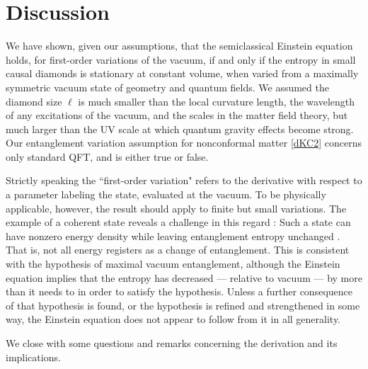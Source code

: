 \documentclass[aps,prd,twocolumn,showpacs,groupedaddress,nofootinbib,longbibliography]{revtex4-1}
\def\la{\langle}
\def\ra{\rangle}
\begin{document}
\section{Discussion}

We have shown, given our assumptions, that the semiclassical Einstein equation 
holds, 
for first-order  variations of the vacuum, 
if and only if the entropy in small causal diamonds is stationary at constant volume, when varied from a maximally symmetric vacuum state of geometry and quantum fields. 
We assumed the diamond size $\ell$ is much smaller than the local curvature length, 
the wavelength of any excitations of the vacuum, and
the scales in the matter field theory, but much larger than the UV scale at which quantum gravity effects become strong.
Our entanglement variation assumption for nonconformal matter \eqref{dKC2} 
concerns only standard QFT, and is either true or false. 

Strictly speaking the ``first-order  variation" refers to the derivative with respect to a parameter labeling the state, evaluated at the vacuum. To be physically applicable, however, the result should apply to finite but small variations. The example of a coherent state reveals a challenge in this regard \cite{Madhavan}: Such a state can have nonzero energy density while leaving entanglement entropy unchanged \cite{Fiola:1994ir, Benedict:1995yp}. That is, not all energy registers as a change of entanglement. This is consistent with the hypothesis of maximal vacuum entanglement, although the Einstein equation implies that the entropy has decreased --- relative to vacuum --- by more than it needs to in order to satisfy the hypothesis. Unless a further consequence of that hypothesis is found, or the hypothesis is refined and strengthened in some way, the Einstein equation does not appear to follow from it in all generality.

We close with some questions and remarks concerning the derivation and its implications.
\end{document}
